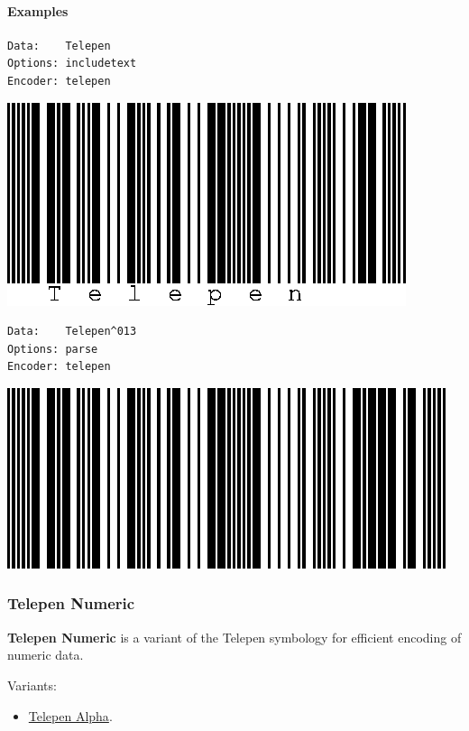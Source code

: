\hypertarget{examples-50}{%
\paragraph{Examples}\label{examples-50}}

\begin{verbatim}
Data:    Telepen
Options: includetext
Encoder: telepen
\end{verbatim}

\includegraphics{images/telepen-1.eps}

\begin{verbatim}
Data:    Telepen^013
Options: parse
Encoder: telepen
\end{verbatim}

\includegraphics{images/telepen-2.eps}

\hypertarget{telepen-numeric}{%
\subsubsection{Telepen Numeric}\label{telepen-numeric}}

\textbf{Telepen Numeric} is a variant of the Telepen symbology for
efficient encoding of numeric data.

Variants:

\begin{itemize}
\tightlist
\item
  \protect\hyperlink{telepen}{Telepen Alpha}.
\end{itemize}

